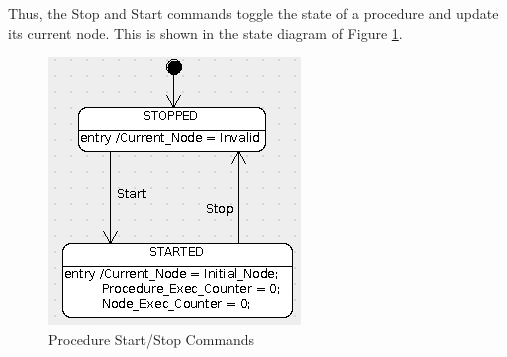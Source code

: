 \documentclass[a4paper,10pt]{article}
\begin{document}
Thus, the Stop and Start commands toggle the state of a procedure and update its current node.
This is shown in the state diagram of Figure \ref{fig:PR_StartStop}.

\begin{figure}[ht]
 \centering
 \includegraphics[scale=0.6,keepaspectratio=true]{../images/PR_StartStop.png}
 \caption{Procedure Start/Stop Commands}
 \label{fig:PR_StartStop}
\end{figure}
\end{document}
